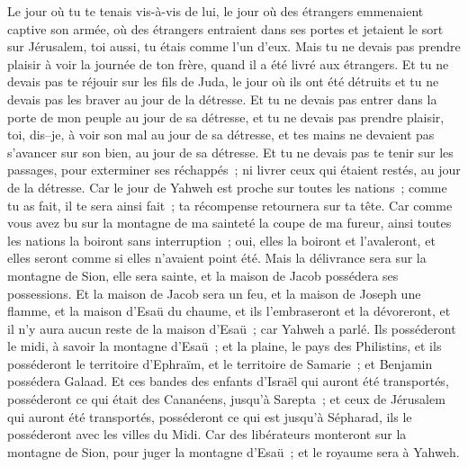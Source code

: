 \begin{multicols}{2}
Le jour où tu te tenais vis-à-vis de lui, le jour où des étrangers emmenaient captive son armée, où des étrangers entraient dans ses portes et jetaient le sort sur Jérusalem, toi aussi, tu étais comme l'un d'eux.
Mais tu ne devais pas prendre plaisir à voir la journée de ton frère, quand il a été livré aux étrangers. Et tu ne devais pas te réjouir sur les fils de Juda, le jour où ils ont été détruits et tu ne devais pas les braver au jour de la détresse.
Et tu ne devais pas entrer dans la porte de mon peuple au jour de sa détresse, et tu ne devais pas prendre plaisir, toi, dis–je, à voir son mal au jour de sa détresse, et tes mains ne devaient pas s'avancer sur son bien, au jour de sa détresse.
Et tu ne devais pas te tenir sur les passages, pour exterminer ses réchappés~; ni livrer ceux qui étaient restés, au jour de la détresse.
Car le jour de Yahweh est proche sur toutes les nations~; comme tu as fait, il te sera ainsi fait~; ta récompense retournera sur ta tête.
Car comme vous avez bu sur la montagne de ma sainteté la coupe de ma fureur, ainsi toutes les nations la boiront sans interruption~; oui, elles la boiront et l'avaleront, et elles seront comme si elles n'avaient point été.
Mais la délivrance sera sur la montagne de Sion, elle sera sainte, et la maison de Jacob possédera ses possessions.
Et la maison de Jacob sera un feu, et la maison de Joseph une flamme, et la maison d'Esaü du chaume, et ils l'embraseront et la dévoreront, et il n'y aura aucun reste de la maison d'Esaü~; car Yahweh a parlé.
Ils posséderont le midi, à savoir la montagne d'Esaü~; et la plaine, le pays des Philistins, et ils posséderont le territoire d'Ephraïm, et le territoire de Samarie~; et Benjamin possédera Galaad.
Et ces bandes des enfants d'Israël qui auront été transportés, posséderont ce qui était des Cananéens, jusqu'à Sarepta~; et ceux de Jérusalem qui auront été transportés, posséderont ce qui est jusqu'à Sépharad, ils le posséderont avec les villes du Midi.
Car des libérateurs monteront sur la montagne de Sion, pour juger la montagne d'Esaü~; et le royaume sera à Yahweh.
\PPE{}
\end{multicols}
